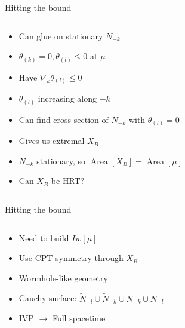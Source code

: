\documentclass{beamer}
\DeclareMathOperator{\Area}{Area}
\newcommand{\thk}{\theta_{(k)}}
\newcommand{\thl}{\theta_{(l)}}
\begin{document}
  \begin{frame}{Hitting the bound}
    \begin{columns}
      \begin{column}{0.4 \linewidth}
        \vspace{-3em}
        \begin{itemize}[<+(1)->]
          \item Can glue on stationary $N_{-k}$
          \item $\thk = 0, \thl \leq 0$ at $\mu$
          \item Have $\nabla_k \thl \leq 0$
          \item $\thl$ increasing along $-k$
          \item Can find cross-section of $N_{-k}$ with $\thl = 0$
          \item Gives us extremal $X_B$
          \item $N_{-k}$ stationary, so $\Area[X_B] = \Area[\mu]$ 
          \item Can $X_B$ be HRT?
        \end{itemize}
      \end{column}
      \begin{column}{0.6 \linewidth}
        
      \end{column}
    \end{columns}
  \end{frame}

  \begin{frame}{Hitting the bound}
    \begin{columns}
      \begin{column}{0.4 \linewidth}
        \vspace{-3em}
        \begin{itemize}[<+->]
          \item Need to build $Iw[\mu]$
          \item Use CPT symmetry through $X_B$
          \item Wormhole-like geometry
          \item Cauchy surface: $\widetilde N_{-l} \cup \widetilde N_{-k} \cup N_{-k} \cup N_{-l}$
          \item IVP $\rightarrow$ Full spacetime
        \end{itemize}
      \end{column}
      \begin{column}{0.6 \linewidth}
        
      \end{column}
    \end{columns}
  \end{frame}
\end{document}
